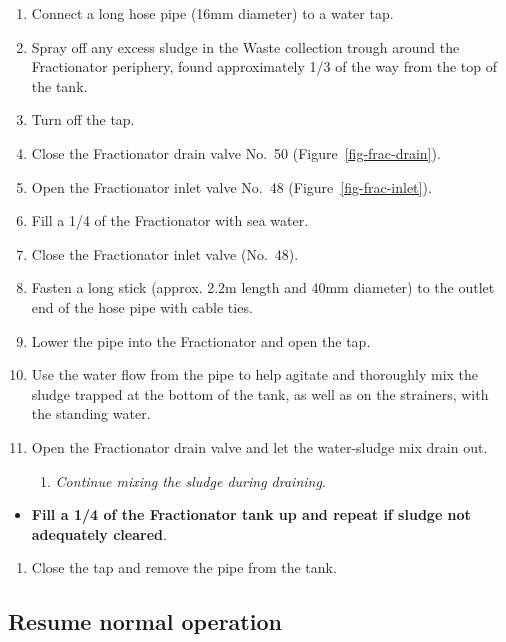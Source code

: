 \documentclass[
  letterpaper,
  DIV=11,
  numbers=noendperiod]{scrreprt}
\providecommand{\tightlist}{%
  \setlength{\itemsep}{0pt}\setlength{\parskip}{0pt}}\usepackage{longtable,booktabs,array}
\begin{document}
\begin{enumerate}
\def\labelenumi{\arabic{enumi}.}
\setcounter{enumi}{9}
\tightlist
\item
  Connect a long hose pipe (16mm diameter) to a water tap.
\item
  Spray off any excess sludge in the Waste collection trough around the
  Fractionator periphery, found approximately 1/3 of the way from the
  top of the tank.
\item
  Turn off the tap.
\item
  Close the Fractionator drain valve No.~50
  (Figure~\ref{fig-frac-drain}).
\item
  Open the Fractionator inlet valve No.~48
  (Figure~\ref{fig-frac-inlet}).
\item
  Fill a 1/4 of the Fractionator with sea water.
\item
  Close the Fractionator inlet valve (No.~48).
\item
  Fasten a long stick (approx. 2.2m length and 40mm diameter) to the
  outlet end of the hose pipe with cable ties.
\item
  Lower the pipe into the Fractionator and open the tap.
\item
  Use the water flow from the pipe to help agitate and thoroughly mix
  the sludge trapped at the bottom of the tank, as well as on the
  strainers, with the standing water.
\item
  Open the Fractionator drain valve and let the water-sludge mix drain
  out.

  \begin{enumerate}
  \def\labelenumii{\roman{enumii})}
  \tightlist
  \item
    \emph{Continue mixing the sludge during draining}.
  \end{enumerate}
\end{enumerate}

\begin{itemize}
\tightlist
\item
  \textbf{Fill a 1/4 of the Fractionator tank up and repeat if sludge
  not adequately cleared}.
\end{itemize}

\begin{enumerate}
\def\labelenumi{\arabic{enumi}.}
\setcounter{enumi}{20}
\tightlist
\item
  Close the tap and remove the pipe from the tank.
\end{enumerate}

\hypertarget{sec-foam-resume}{%
\subsection{Resume normal operation}\label{sec-foam-resume}}
\end{document}
